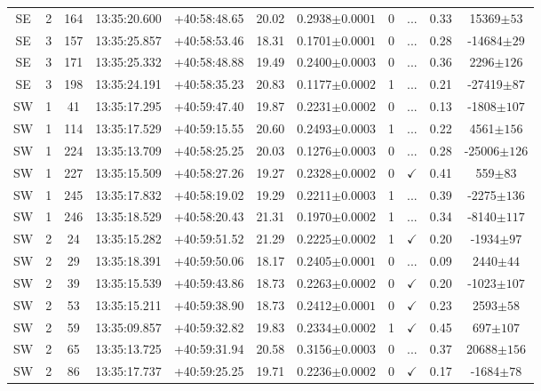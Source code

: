 \begin{table}
\begin{tabular}{ccccccccccc}
		SE & 2 & 164 & 13:35:20.600 & +40:58:48.65 & 20.02 & 0.2938$\pm{0.0001}$ & 0 & ... & 0.33 & 15369$\pm{53}$ \\
		SE & 3 & 157 & 13:35:25.857 & +40:58:53.46 & 18.31 & 0.1701$\pm{0.0001}$ & 0 & ... & 0.28 & -14684$\pm{29}$ \\
		SE & 3 & 171 & 13:35:25.332 & +40:58:48.88 & 19.49 & 0.2400$\pm{0.0003}$ & 0 & ... & 0.36 & 2296$\pm{126}$ \\
		SE & 3 & 198 & 13:35:24.191 & +40:58:35.23 & 20.83 & 0.1177$\pm{0.0002}$ & 1 & ... & 0.21 & -27419$\pm{87}$ \\
		SW & 1 & 41 & 13:35:17.295 & +40:59:47.40 & 19.87 & 0.2231$\pm{0.0002}$ & 0 & ... & 0.13 & -1808$\pm{107}$ \\
		SW & 1 & 114 & 13:35:17.529 & +40:59:15.55 & 20.60 & 0.2493$\pm{0.0003}$ & 1 & ... & 0.22 & 4561$\pm{156}$ \\
		SW & 1 & 224 & 13:35:13.709 & +40:58:25.25 & 20.03 & 0.1276$\pm{0.0003}$ & 0 & ... & 0.28 & -25006$\pm{126}$ \\
		SW & 1 & 227 & 13:35:15.509 & +40:58:27.26 & 19.27 & 0.2328$\pm{0.0002}$ & 0 & $\checkmark$ & 0.41 & 559$\pm{83}$ \\
		SW & 1 & 245 & 13:35:17.832 & +40:58:19.02 & 19.29 & 0.2211$\pm{0.0003}$ & 1 & ... & 0.39 & -2275$\pm{136}$ \\
		SW & 1 & 246 & 13:35:18.529 & +40:58:20.43 & 21.31 & 0.1970$\pm{0.0002}$ & 1 & ... & 0.34 & -8140$\pm{117}$ \\
		SW & 2 & 24 & 13:35:15.282 & +40:59:51.52 & 21.29 & 0.2225$\pm{0.0002}$ & 1 & $\checkmark$ & 0.20 & -1934$\pm{97}$ \\
		SW & 2 & 29 & 13:35:18.391 & +40:59:50.06 & 18.17 & 0.2405$\pm{0.0001}$ & 0 & ... & 0.09 & 2440$\pm{44}$ \\
		SW & 2 & 39 & 13:35:15.539 & +40:59:43.86 & 18.73 & 0.2263$\pm{0.0002}$ & 0 & $\checkmark$ & 0.20 & -1023$\pm{107}$ \\
		SW & 2 & 53 & 13:35:15.211 & +40:59:38.90 & 18.73 & 0.2412$\pm{0.0001}$ & 0 & $\checkmark$ & 0.23 & 2593$\pm{58}$ \\
		SW & 2 & 59 & 13:35:09.857 & +40:59:32.82 & 19.83 & 0.2334$\pm{0.0002}$ & 1 & $\checkmark$ & 0.45 & 697$\pm{107}$ \\
		SW & 2 & 65 & 13:35:13.725 & +40:59:31.94 & 20.58 & 0.3156$\pm{0.0003}$ & 0 & ... & 0.37 & 20688$\pm{156}$ \\
		SW & 2 & 86 & 13:35:17.737 & +40:59:25.25 & 19.71 & 0.2236$\pm{0.0002}$ & 0 & $\checkmark$ & 0.17 & -1684$\pm{78}$ \\

\end{tabular}
\end{table}
